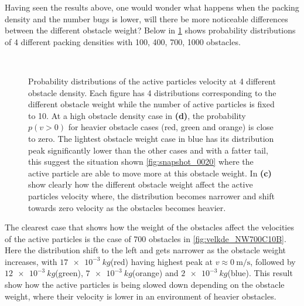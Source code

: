 Having seen the results above, one would wonder what happens when the packing density and the number 
bugs is lower, will there be more noticeable differences between the different obstacle weight? Below in \cref{fig:velkde_NWNC10B} shows 
probability distributions of 4 different packing densities with 100, 400, 700, 1000 obstacles.

\begin{figure}[htbp]
\centering
\\
\caption{Probability distributions of the active particles velocity at 4 different obstacle density. 
Each figure has 4 distributions corresponding to the different obstacle weight while the number of active particles is fixed to 10. 
At a high obstacle density case in \textbf{(d)}, the probability $p(v>0)$ for heavier obstacle cases (red, green and orange) is close to zero. 
The lightest obstacle weight case in blue has its distribution peak significantly lower than the other cases and with a fatter tail, this 
suggest the situation shown \cref{fig:snapshot_0020} where the active particle are able to move more at this obstacle weight. 
In \textbf{(c)} show clearly how the different obstacle weight affect the active particles velocity where, the distribution becomes 
narrower and shift towards zero velocity as the obstacles becomes heavier.} 
\label{fig:velkde_NWNC10B}
\end{figure}

The clearest case that shows how the weight of the obstacles affect the velocities of the active particles is 
the case of 700 obstacles in \cref{fig:velkde_NW700C10B}. Here the distribution shift to the left and gets narrower as the 
obstacle weight increases, with $\SI{17e-3}{kg}$(red) having highest peak at $v\approx\SI{0}{\metre\per\second}$, followed by $\SI{12e-3}{kg}$(green), 
$\SI{7e-3}{kg}$(orange) and $\SI{2e-3}{kg}$(blue). This result show how the active particles is being slowed down 
depending on the obstacle weight, where their velocity is lower in an environment of heavier obstacles. 

